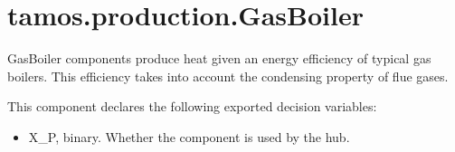 \documentclass[letterpaper,10pt,english]{sphinxmanual}
\begin{document}
\sphinxstepscope


\section{tamos.production.GasBoiler}
\label{\detokenize{generated/tamos.production.GasBoiler:tamos-production-gasboiler}}\label{\detokenize{generated/tamos.production.GasBoiler::doc}}

\begin{fulllineitems}
\label{\detokenize{generated/tamos.production.GasBoiler:tamos.production.GasBoiler}}
\pysigstartsignatures
{}
\pysigstopsignatures{}

\begin{fulllineitems}
\label{\detokenize{generated/tamos.production.GasBoiler:tamos.production.GasBoiler.__init__}}
\pysigstartsignatures
{}
\pysigstopsignatures
\sphinxAtStartPar
GasBoiler components produce heat given an energy efficiency of typical gas boilers.
This efficiency takes into account the condensing property of flue gases.

\sphinxAtStartPar
This component declares the following exported decision variables:
\begin{itemize}
\item {} 
\sphinxAtStartPar
X\_P, binary.
Whether the component is used by the hub.


\end{itemize}
\end{fulllineitems}
\end{fulllineitems}
\end{document}
